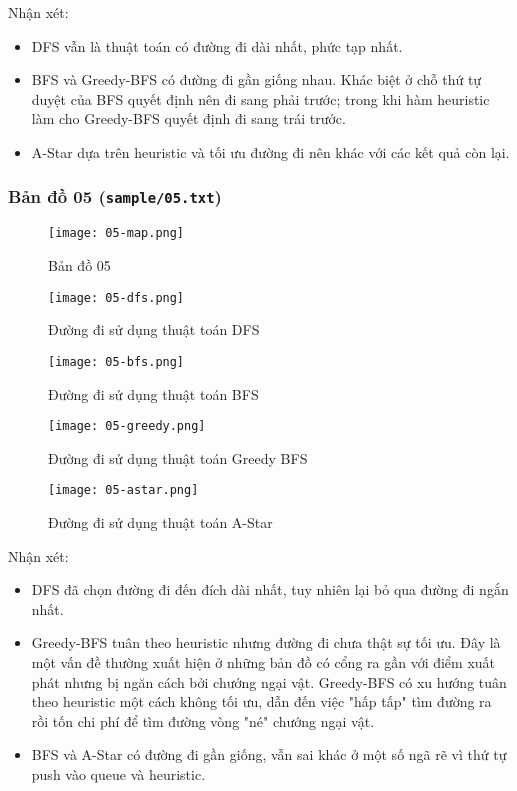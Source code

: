 \documentclass{article}
\begin{document}
Nhận xét:
\begin{itemize}
\item DFS vẫn là thuật toán có đường đi dài nhất, phức tạp nhất.
\item BFS và Greedy-BFS có đường đi gần giống nhau. Khác biệt ở chỗ thứ tự duyệt của BFS quyết định nên đi sang phải trước; trong khi hàm heuristic làm cho Greedy-BFS quyết định đi sang trái trước. 
\item A-Star dựa trên heuristic và tối ưu đường đi nên khác với các kết quả còn lại.
\end{itemize}

\subsubsection{Bản đồ 05 (\texttt{sample/05.txt})}
\begin{figure}[H]
	\centering
	\texttt{[image: 05-map.png]}
	\caption{Bản đồ 05}
\end{figure}

\begin{figure}[H]
	\centering
	\texttt{[image: 05-dfs.png]}
	\caption{Đường đi sử dụng thuật toán DFS}
\end{figure}

\begin{figure}[H]
	\centering
	\texttt{[image: 05-bfs.png]}
	\caption{Đường đi sử dụng thuật toán BFS}
\end{figure}

\begin{figure}[H]
	\centering
	\texttt{[image: 05-greedy.png]}
	\caption{Đường đi sử dụng thuật toán Greedy BFS}
\end{figure}

\begin{figure}[H]
	\centering
	\texttt{[image: 05-astar.png]}
	\caption{Đường đi sử dụng thuật toán A-Star}
\end{figure}

Nhận xét:
\begin{itemize}
\item DFS đã chọn đường đi đến đích dài nhất, tuy nhiên lại bỏ qua đường đi ngắn nhất.
\item Greedy-BFS tuân theo heuristic nhưng đường đi chưa thật sự tối ưu. Đây là một vấn đề thường xuất hiện ở những bản đồ có cổng ra gần với điểm xuất phát nhưng bị ngăn cách bởi chướng ngại vật. Greedy-BFS có xu hướng tuân theo heuristic một cách không tối ưu, dẫn đến việc "hấp tấp" tìm đường ra rồi tốn chi phí để tìm đường vòng "né" chướng ngại vật.
\item BFS và A-Star có đường đi gần giống, vẫn sai khác ở một số ngã rẽ vì thứ tự push vào queue và heuristic.
\end{itemize}
\end{document}
